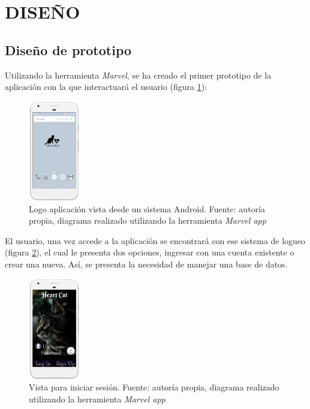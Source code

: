 \documentclass[letterpaper, 10 pt, conference]{ieeeconf}  %
\begin{document}
   
\section{DISE\~{N}O}

\subsection{Dise\~{n}o de prototipo}

Utilizando la herramienta \textit{Marvel}, se ha creado el primer prototipo de la aplicaci\'on con la que interactuar\'a el usuario (figura \ref{fig:home}):

\begin{figure}
\centering
\includegraphics[width=0.2\textwidth]{hc1.png}
\caption{Logo aplicaci\'on vista desde un sistema Android. Fuente: autor\'ia propia, diagrama realizado utilizando la herramienta \textit{Marvel app}}
\label{fig:home}
\end{figure}

El usuario, una vez accede a la aplicaci\'on se encontrar\'a con ese sistema de logueo (figura \ref{fig:login1}), el cual le presenta dos opciones, ingresar con una cuenta existente o crear una nueva. As\'i, se presenta la necesidad de manejar una base de datos.\\

\begin{figure}
\centering
\includegraphics[width=0.2\textwidth]{hc2.png}
\caption{Vista para iniciar sesi\'on. Fuente: autor\'ia propia, diagrama realizado utilizando la herramienta \textit{Marvel app}}
\label{fig:login1}
\end{figure}
\end{document}
